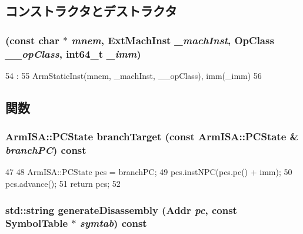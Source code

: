 \subsection{コンストラクタとデストラクタ}
\hypertarget{classArmISA_1_1BranchImm64_a5c757855b245901a85aa1fe1fa370d3f}{
\subsubsection[{BranchImm64}]{ (const char $\ast$ {\em mnem}, \/  {\bf ExtMachInst} {\em \_\-machInst}, \/  OpClass {\em \_\-\_\-opClass}, \/  int64\_\-t {\em \_\-imm})}}
\label{classArmISA_1_1BranchImm64_a5c757855b245901a85aa1fe1fa370d3f}



\begin{DoxyCode}
54                               :
55         ArmStaticInst(mnem, _machInst, __opClass), imm(_imm)
56     {}

\end{DoxyCode}


\subsection{関数}
\hypertarget{classArmISA_1_1BranchImm64_aef1dd7539a8d8c49730120f2c0b8088e}{
\subsubsection[{branchTarget}]{\setlength{\rightskip}{0pt plus 5cm}ArmISA::PCState branchTarget (const ArmISA::PCState \& {\em branchPC}) const}}
\label{classArmISA_1_1BranchImm64_aef1dd7539a8d8c49730120f2c0b8088e}



\begin{DoxyCode}
47 {
48     ArmISA::PCState pcs = branchPC;
49     pcs.instNPC(pcs.pc() + imm);
50     pcs.advance();
51     return pcs;
52 }
\end{DoxyCode}
\hypertarget{classArmISA_1_1BranchImm64_a95d323a22a5f07e14d6b4c9385a91896}{
\subsubsection[{generateDisassembly}]{\setlength{\rightskip}{0pt plus 5cm}std::string generateDisassembly ({\bf Addr} {\em pc}, \/  const SymbolTable $\ast$ {\em symtab}) const}}
\label{classArmISA_1_1BranchImm64_a95d323a22a5f07e14d6b4c9385a91896}


